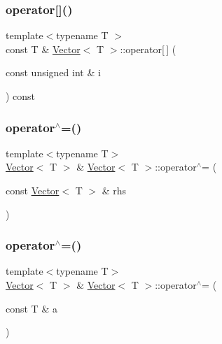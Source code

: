 \mbox{\label{classVector_a36cc881f0270de628bec7a80bbdab741}} 
\subsubsection{\texorpdfstring{operator[]()}{operator[]()}\hspace{0.1cm}{\footnotesize\ttfamily [2/2]}}
{\footnotesize\ttfamily template$<$typename T $>$ \\
const T \& \mbox{\hyperlink{classVector}{Vector}}$<$ T $>$\+::operator\mbox{[}$\,$\mbox{]} (\begin{DoxyParamCaption}\item[{const unsigned int \&}]{i }\end{DoxyParamCaption}) const\hspace{0.3cm}{\ttfamily [inline]}}

\mbox{\label{classVector_acd4d558272832a19d614468400ca605d}} 
\subsubsection{\texorpdfstring{operator$^\wedge$=()}{operator^=()}\hspace{0.1cm}{\footnotesize\ttfamily [1/2]}}
{\footnotesize\ttfamily template$<$typename T$>$ \\
\mbox{\hyperlink{classVector}{Vector}}$<$ T $>$ \& \mbox{\hyperlink{classVector}{Vector}}$<$ T $>$\+::operator$^\wedge$= (\begin{DoxyParamCaption}\item[{const \mbox{\hyperlink{classVector}{Vector}}$<$ T $>$ \&}]{rhs }\end{DoxyParamCaption})\hspace{0.3cm}{\ttfamily [inline]}}

\mbox{\label{classVector_a6767000b5cbf4999aa301eb24a7b74fc}} 
\subsubsection{\texorpdfstring{operator$^\wedge$=()}{operator^=()}\hspace{0.1cm}{\footnotesize\ttfamily [2/2]}}
{\footnotesize\ttfamily template$<$typename T$>$ \\
\mbox{\hyperlink{classVector}{Vector}}$<$ T $>$ \& \mbox{\hyperlink{classVector}{Vector}}$<$ T $>$\+::operator$^\wedge$= (\begin{DoxyParamCaption}\item[{const T \&}]{a }\end{DoxyParamCaption})\hspace{0.3cm}{\ttfamily [inline]}}

